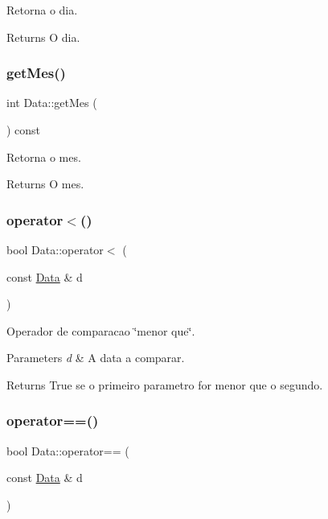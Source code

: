 Retorna o dia. 

\begin{DoxyReturn}{Returns}
O dia. 
\end{DoxyReturn}
\hypertarget{class_data_a1df6f5e1695c7cae56b9ee752a6895e8}{}\label{class_data_a1df6f5e1695c7cae56b9ee752a6895e8} 
\subsubsection{\texorpdfstring{get\+Mes()}{getMes()}}
{\footnotesize\ttfamily int Data\+::get\+Mes (\begin{DoxyParamCaption}{ }\end{DoxyParamCaption}) const}



Retorna o mes. 

\begin{DoxyReturn}{Returns}
O mes. 
\end{DoxyReturn}
\hypertarget{class_data_a5f305274d7f60e8f1208dbd623ed4e71}{}\label{class_data_a5f305274d7f60e8f1208dbd623ed4e71} 
\subsubsection{\texorpdfstring{operator$<$()}{operator<()}}
{\footnotesize\ttfamily bool Data\+::operator$<$ (\begin{DoxyParamCaption}\item[{const \hyperlink{class_data}{Data} \&}]{d }\end{DoxyParamCaption})}



Operador de comparacao \char`\"{}menor que\char`\"{}. 


\begin{DoxyParams}{Parameters}
{\em d} & A data a comparar.\\
\hline
\end{DoxyParams}
\begin{DoxyReturn}{Returns}
True se o primeiro parametro for menor que o segundo. 
\end{DoxyReturn}
\hypertarget{class_data_ae4c00338b1d73e12dc177b48d7b04d89}{}\label{class_data_ae4c00338b1d73e12dc177b48d7b04d89} 
\subsubsection{\texorpdfstring{operator==()}{operator==()}}
{\footnotesize\ttfamily bool Data\+::operator== (\begin{DoxyParamCaption}\item[{const \hyperlink{class_data}{Data} \&}]{d }\end{DoxyParamCaption})}



